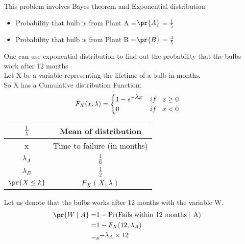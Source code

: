 
This problem involves Bayes theorem and \newline Exponential distribution
\bigskip
\begin{itemize}
    \item Probability that bulb is from Plant A =\newline $\pr{A}$ = \(\frac{1}{5}\)
    \item Probability that bulb is from Plant B =\newline$\pr{B}$ = \( \frac{4}{5} \)
\end{itemize}
\bigskip
One can use exponential distribution to find out the probability that the bulbs work after 12 months\\
Let X be a variable representing the lifetime of a bulb in months.\\
So X has a Cumulative distribution Function:
\begin{equation}
    F_X(x,\lambda) =
    \begin{cases}
        1 - {e}^{-\displaystyle\lambda x} & if \hspace{0.3cm}x \geq 0 \\
        0                                 & if \hspace{0.3cm}x < 0
    \end{cases}
\end{equation}
\begin{table}[!ht]
    \begin{center}
        \resizebox{\columnwidth}{!}
        {
            \begin{tabular}{|c|c|}
                \hline
                $\frac{1}{\displaystyle\lambda}$ &  Mean of distribution\\
                \hline
                x & Time to failure (in months)\\
                \hline
                $\lambda_A$ & $\frac{1}{6}$\\
                \hline
                $\lambda_B$ & $\frac{1}{2}$\\
                \hline
                $\pr{X\leq k}$ & $F_X(X,\lambda)$\\
                \hline
            \end{tabular}
        }
    \end{center}
\end{table}
Let us denote that the bulbs works after 12 months with the variable W.
\begin{align}
\text{$\pr{W \mid A}$} = & 1 -\notag \text{Pr(Fails within 12 months $\mid$ A)}\\
    = & 1 - F_X(12,\lambda_A)                       \\
    = & {e}^{\displaystyle - \lambda_A \times 12} 
\end{align}
